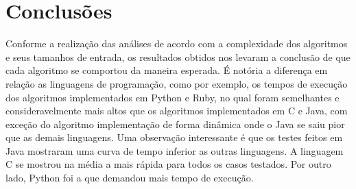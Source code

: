 \documentclass[
	12pt,				%
	oneside,   	        %
	a4paper,			%
	english,			%
	french,				%
	spanish,			%
	brazil,				%
	]{pacotes/abntex2}
\begin{document}
\section{Conclusões}
Conforme a realização das análises de acordo com a complexidade dos algoritmos e seus tamanhos de entrada, os resultados obtidos nos levaram a conclusão de que cada algoritmo se comportou da maneira esperada. É notória a diferença em relação as linguagens de programação, como por exemplo, os tempos de execução dos algoritmos implementados em Python e Ruby, no qual foram semelhantes e consideravelmente mais altos que os algoritmos implementados em C e Java, com exceção do algoritmo implementação de forma dinâmica onde o Java se saiu pior que as demais linguagens. Uma observação interessante é que os testes feitos em Java mostraram uma curva de tempo inferior as outras linguagens. A linguagem C se mostrou na média a mais rápida para todos os casos testados. Por outro lado, Python foi a que demandou mais tempo de execução.
\label{sec:conclusoes}

\newpage


\postextual
\renewcommand{\bibsection}{%
\section{\bibname}
\bibmark
\prebibhook}




\newpage
\end{document}
